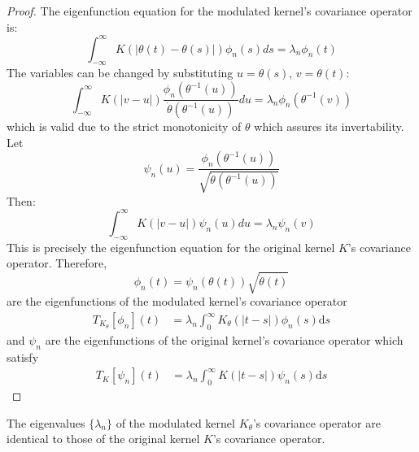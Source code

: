 \documentclass{mc}
\newcommand{\mathd}{\mathrm{d}}
\begin{document}
\begin{proof}
  The eigenfunction equation for the modulated kernel's covariance operator is:
  \begin{equation}
    \int_{- \infty}^{\infty} K (| \theta (t) - \theta (s) |) \phi_n (s) ds =
    \lambda_n \phi_n (t)
  \end{equation}
  The variables can be changed by substituting $u = \theta (s)$, $v = \theta
  (t)$:
  \begin{equation}
    \int_{- \infty}^{\infty} K (|v - u|) \frac{\phi_n (\theta^{- 1}
    (u))}{\dot{\theta} (\theta^{- 1} (u))} du = \lambda_n \phi_n (\theta^{- 1}
    (v))
  \end{equation}
  which is valid due to the strict monotonicity of $\theta$ which assures its
  invertability. Let
  \begin{equation}
    \psi_n (u) = \frac{\phi_n (\theta^{- 1} (u))}{\sqrt{\dot{\theta}
    (\theta^{- 1} (u))}}
  \end{equation}
  Then:
  \begin{equation}
    \int_{- \infty}^{\infty} K (|v - u|) \psi_n (u) du = \lambda_n \psi_n (v)
  \end{equation}
  This is precisely the eigenfunction equation for the original kernel $K$'s covariance operator. Therefore,
  \begin{equation}
    \phi_n (t) = \psi_n (\theta (t)) \sqrt{\dot{\theta} (t)}
  \end{equation}
  are the eigenfunctions of the modulated kernel's covariance operator 
  \begin{equation}
    \begin{array}{ll}
      T_{K_{\theta}} [\phi_n] (t) & = \lambda_n \int_0^{\infty} K_{\theta} (|
      t - s |) \phi_n (s) \mathd s
    \end{array}
  \end{equation}
  and $\psi_n$ are the eigenfunctions of the original kernel's covariance operator which satisfy
  \begin{equation}
    \begin{array}{ll}
      T_K [\psi_n] (t) & = \lambda_n \int_0^{\infty} K  (| t - s |) \psi_n (s)
      \mathd s
    \end{array}
  \end{equation}
  
\end{proof}

\begin{corollary}
  The eigenvalues $\{\lambda_n \}$ of the modulated kernel $K_{\theta}$'s covariance operator are identical to those of the original kernel $K$'s covariance operator.
\end{corollary}
\end{document}

